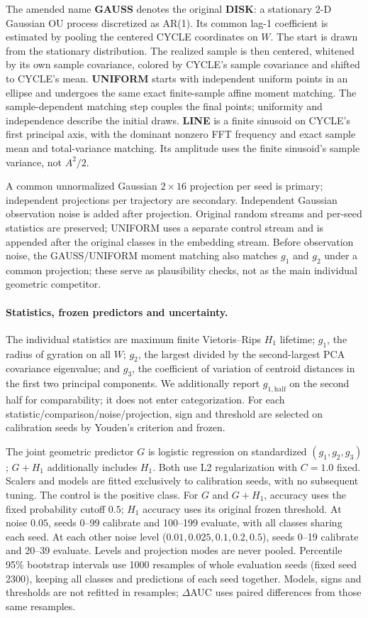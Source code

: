 The amended name \textbf{GAUSS} denotes the original \textbf{DISK}: a stationary
2-D Gaussian OU process discretized as AR(1). Its common lag-1 coefficient is
estimated by pooling the centered CYCLE coordinates on $W$. The start is drawn
from the stationary distribution. The realized sample is then centered, whitened
by its own sample covariance, colored by CYCLE's sample covariance and shifted
to CYCLE's mean. \textbf{UNIFORM} starts with independent uniform points in an
ellipse and undergoes the same exact finite-sample affine moment matching.
The sample-dependent matching step couples the final points; uniformity and
independence describe the initial draws. \textbf{LINE} is a finite sinusoid on
CYCLE's first principal axis, with the dominant nonzero FFT frequency and exact
sample mean and total-variance matching. Its amplitude uses the finite
sinusoid's sample variance, not $A^2/2$.

A common unnormalized Gaussian $2\times16$ projection per seed is primary;
independent projections per trajectory are secondary. Independent Gaussian
observation noise is added after projection. Original random streams and
per-seed statistics are preserved; UNIFORM uses a separate control stream and is
appended after the original classes in the embedding stream. Before observation
noise, the GAUSS/UNIFORM moment matching also matches $g_1$ and $g_2$ under a
common projection; these serve as plausibility checks, not as the main
individual geometric competitor.

\paragraph{Statistics, frozen predictors and uncertainty.}
The individual statistics are maximum finite Vietoris--Rips $H_1$ lifetime;
$g_1$, the radius of gyration on all $W$; $g_2$, the largest divided by the
second-largest PCA covariance eigenvalue; and $g_3$, the coefficient of variation
of centroid distances in the first two principal components. We additionally
report $g_{1,\mathrm{half}}$ on the second half for comparability; it does not enter
categorization. For each statistic/comparison/noise/projection, sign and threshold
are selected on calibration seeds by Youden's criterion and frozen.

The joint geometric predictor $G$ is logistic regression on standardized
$(g_1,g_2,g_3)$; $G+H_1$ additionally includes $H_1$. Both use L2 regularization
with $C=1.0$ fixed. Scalers and models are fitted exclusively to calibration
seeds, with no subsequent tuning. The control is the positive class. For $G$
and $G+H_1$, accuracy uses the fixed probability cutoff $0.5$; $H_1$ accuracy uses
its original frozen threshold. At noise $0.05$, seeds 0--99 calibrate and
100--199 evaluate, with all classes sharing each seed. At each other noise
level ($0.01,0.025,0.1,0.2,0.5$), seeds 0--19 calibrate and 20--39 evaluate.
Levels and projection modes are never pooled. Percentile 95\% bootstrap
intervals use 1000 resamples of whole evaluation seeds (fixed seed 2300), keeping
all classes and predictions of each seed together. Models, signs and thresholds
are not refitted in resamples; $\Delta$AUC uses paired differences from those
same resamples.

